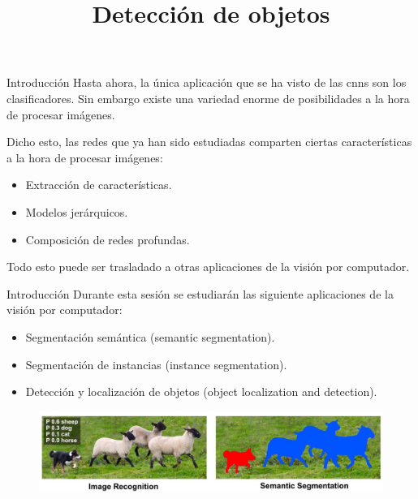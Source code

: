 



\title{Detección de objetos}


\maketitle

\begin{frame}{Introducción}
Hasta ahora, la única \alert{aplicación} que se ha visto de las \alert{\glspl{cnn}} son los clasificadores. Sin embargo existe una variedad enorme de posibilidades a la hora de procesar imágenes.

Dicho esto, las redes que ya han sido estudiadas comparten ciertas características a la hora de \alert{procesar imágenes}:

\begin{itemize}
    \item Extracción de características.
    \item Modelos jerárquicos.
    \item Composición de redes profundas.
\end{itemize}

Todo esto puede ser \alert{trasladado} a otras aplicaciones de la \alert{visión por computador}.
\end{frame}

\begin{frame}{Introducción}
Durante esta sesión se estudiarán las siguiente aplicaciones de la visión por computador:
\begin{itemize}
    \item \alert{Segmentación semántica} (semantic segmentation).
    \item Segmentación de instancias (instance segmentation).
    \item Detección y localización de objetos (object localization and detection).
\end{itemize}

\begin{figure}
    \centering
    \includegraphics[width=\textwidth]{Slides/figures/Tema 4/SemanticSeg.jpg}
    \caption{\cite{SemanticSeg}}
\end{figure}
\end{frame}

